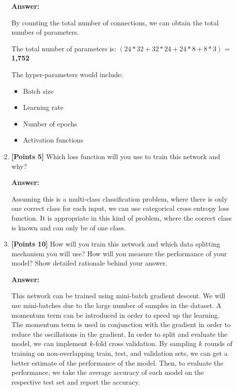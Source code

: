 \documentclass[12pt]{article}
\begin{document}
\begin{enumerate}
\begin{enumerate}
                    \textbf{Answer:}

                    By counting the total number of connections, we can obtain
                    the total number of parameters.

                    The total number of parameters is: $(24*32 + 32*24 + 24*8 +
                        8*3)$ = \textbf{1,752}

                    The hyper-parameters would include:
                    \begin{itemize}
                        \item Batch size
                        \item Learning rate
                        \item Number of epochs
                        \item Activation functions
                    \end{itemize}

              \item \textbf{[Points 5]} Which loss function will you use to
                    train this network and why?

                    \textbf{Answer:}

                    Assuming this is a multi-class classification problem, where
                    there is only one correct class for each input, we can use
                    categorical cross entropy loss function. It is appropriate
                    in this kind of problem, where the correct class is known
                    and can only be of one class.

              \item \textbf{[Points 10]} How will you train this network and
                    which data splitting mechanism you will use? How will you
                    measure the performance of your model? Show detailed
                    rationale behind your answer.

                    \textbf{Answer:}

                    This network can be trained using mini-batch gradient
                    descent. We will use mini-batches due to the large number of
                    samples in the dataset. A momentum term can be introduced in
                    order to speed up the learning. The momentum term is used in
                    conjunction with the gradient in order to reduce the
                    oscillations in the gradient. In order to split and evaluate
                    the model, we can implement $k$-fold cross validation. By
                    sampling $k$ rounds of training on non-overlapping train,
                    test, and validation sets, we can get a better estimate of
                    the performance of the model. Then, to evaluate the
                    performance, we take the average accuracy of each model on
                    the respective test set and report the accuracy.
          \end{enumerate}
\end{enumerate}
\end{document}
